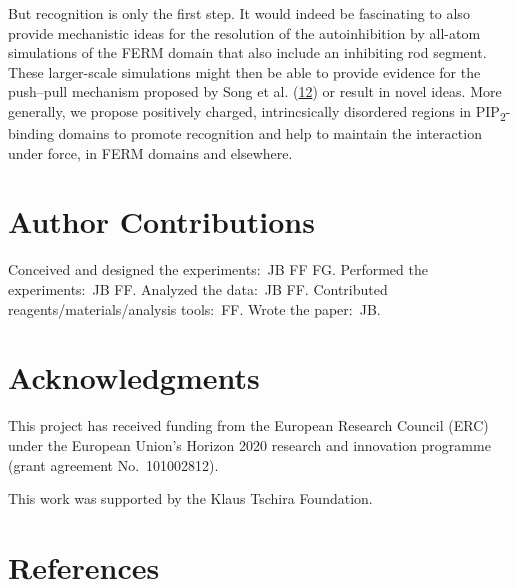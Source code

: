 \documentclass[
  twocolumn]{biophys-new-mod}
\begin{document}
But recognition is only the first step. It would indeed be fascinating
to also provide mechanistic ideas for the resolution of the
autoinhibition by all-atom simulations of the FERM domain that also
include an inhibiting rod segment. These larger-scale simulations might
then be able to provide evidence for the push--pull mechanism proposed
by Song et al.
(\protect\hyperlink{ref-songNovelMembranedependentSwitch2012a}{12}) or
result in novel ideas. More generally, we propose positively charged,
intrincsically disordered regions in PIP\textsubscript{2}-binding
domains to promote recognition and help to maintain the interaction
under force, in FERM domains and elsewhere.

\hypertarget{author-contributions}{%
\section{Author Contributions}\label{author-contributions}}

Conceived and designed the experiments:~JB FF FG. Performed the
experiments:~JB FF. Analyzed the data:~JB FF. Contributed
reagents/materials/analysis tools:~FF. Wrote the paper:~JB.

\hypertarget{acknowledgments}{%
\section{Acknowledgments}\label{acknowledgments}}

This project has received funding from the European Research Council
(ERC) under the European Union's Horizon 2020 research and innovation
programme (grant agreement No.~101002812).

This work was supported by the Klaus Tschira Foundation.

\hypertarget{references}{%
\section{References}\label{references}}
\end{document}
